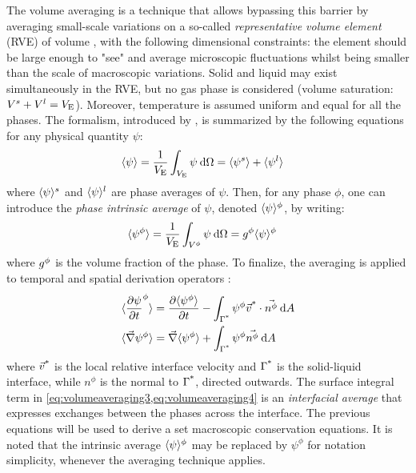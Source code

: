 The volume averaging is a technique that allows bypassing this barrier by averaging
small-scale variations on a so-called \emph{representative volume element} (RVE) \citep{dantzig_solidification_2009} of volume \rev, with the 
following dimensional constraints:
the element should be large enough to "see" and average microscopic fluctuations whilst being smaller than the scale of macroscopic variations.
Solid and liquid may exist simultaneously in the RVE, but no gas phase is considered (volume saturation: $V^s+V^l=V_\text{E}$). 
Moreover, temperature is assumed uniform and equal for all the phases.
The formalism, introduced by \citet{ni_volume-averaged_1991}, is summarized by the following equations for any physical quantity $\psi$:
\begin{align}
\label{eq:volumeaveraging1}
& \langle \psi \rangle = \frac{1}{V_\text{E}} \int_{V_\text{E}} \psi\: \mathrm{d}\Omega = \langle \psi^s \rangle + \langle \psi^l \rangle
\end{align}
where $\langle \psi \rangle^s$ and $\langle \psi \rangle^l$ are phase averages of $\psi$. Then, for any phase $\phi$, one can introduce the \emph{phase intrinsic average} of $\psi$, denoted $\langle \psi \rangle^\phi$, by writing:
\begin{align}
\label{eq:volumeaveraging2}
& \langle \psi^\phi \rangle = \frac{1}{V_\text{E}} \int_{V^\phi} \psi\: \mathrm{d}\Omega = g^{\phi}  \langle \psi \rangle^\phi
\end{align}
where $g^{\phi} $ is the volume fraction of the phase. To finalize, the averaging is applied to temporal and spatial derivation operators \citep{rivaux_simulation_2011}:
\begin{align}
\label{eq:volumeaveraging3}
& \langle  \frac{\partial \psi}{\partial t} ^\phi  \rangle = \frac{\partial \langle \psi^\phi \rangle}{\partial t} - \int_{{\Gamma}^{\text{*}} } \psi^\phi \vec{v}^\text{*} \cdot \vec{n^\phi}\: \mathrm{d}A \\
\label{eq:volumeaveraging4}
& \langle  \vec{\nabla} \psi^\phi  \rangle = \vec{\nabla} \langle \psi^\phi \rangle + \int_{{\Gamma}^{\text{*}} } \psi^\phi \vec{n^\phi}\: \mathrm{d}A
\end{align}
where $\vec{v}^\text{*}$ is the local relative interface velocity and ${\Gamma}^{\text{*}} $ is the solid-liquid interface, 
while $n^\phi$ is the normal to ${\Gamma}^{\text{*}} $, directed outwards. The surface integral term in 
\cref{eq:volumeaveraging3,eq:volumeaveraging4} is an \emph{interfacial average} 
that expresses exchanges between the phases across the interface. The previous equations will 
be used to derive a set macroscopic conservation equations. 
It is noted that the intrinsic average $\langle \psi \rangle^\phi$ may be replaced by ${\psi}^\phi$ 
for notation simplicity, whenever the averaging technique applies.
%
%
